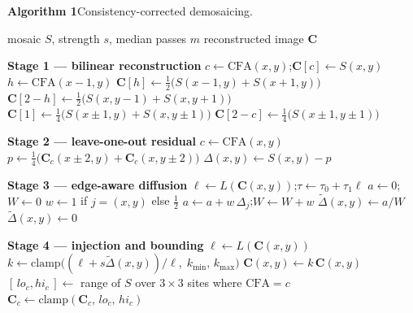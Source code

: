 \documentclass[10pt,a4paper]{article}
\begin{document}
%
\bigskip
\noindent\textbf{Algorithm 1}\quad Consistency-corrected demosaicing.\par
\medskip
\begin{algorithmic}[1]
\Require mosaic $S$, strength $s$, median passes $m$
\Ensure reconstructed image $\mathbf{C}$

\Statex
\Statex \textbf{Stage 1 --- bilinear reconstruction}
  \State $c \gets \mathrm{CFA}(x,y)$;\quad $\mathbf{C}[c] \gets S(x,y)$
   
    \State $h \gets \mathrm{CFA}(x{-}1,y)$
    \State $\mathbf{C}[h] \gets \tfrac{1}{2}\bigl(S(x{-}1,y) + S(x{+}1,y)\bigr)$
    \State $\mathbf{C}[2{-}h] \gets \tfrac{1}{2}\bigl(S(x,y{-}1) + S(x,y{+}1)\bigr)$
  \Else {}
    \State $\mathbf{C}[1] \gets \tfrac{1}{4}\bigl(S(x{\pm}1,y) + S(x,y{\pm}1)\bigr)$
    \State $\mathbf{C}[2{-}c] \gets \tfrac{1}{4}\bigl(S(x{\pm}1,y{\pm}1)\bigr)$
  \EndIf
\EndFor

\Statex
\Statex \textbf{Stage 2 --- leave-one-out residual}
  \State $c \gets \mathrm{CFA}(x,y)$
  \State $p \gets \tfrac{1}{4}\bigl(\mathbf{C}_c(x{\pm}2,y) + \mathbf{C}_c(x,y{\pm}2)\bigr)$
  \State $\Delta(x,y) \gets S(x,y) - p$
\EndFor

\Statex
\Statex \textbf{Stage 3 --- edge-aware diffusion}
  \State $\ell \gets L(\mathbf{C}(x,y))$;\quad $\tau \gets \tau_0 + \tau_1 \ell$
  \State $a \gets 0$;\quad $W \gets 0$
      \State $w \gets 1$ if $j = (x,y)$ else $\tfrac{1}{2}$
      \State $a \gets a + w\,\Delta_j$;\quad $W \gets W + w$
    \EndIf
  \EndFor
   \State $\tilde{\Delta}(x,y) \gets a / W$
  \Else \State $\tilde{\Delta}(x,y) \gets 0$ \EndIf
\EndFor

\Statex
\Statex \textbf{Stage 4 --- injection and bounding}
  \State $\ell \gets L(\mathbf{C}(x,y))$
  \If{$\ell > \epsilon$}
    \State $k \gets \mathrm{clamp}\bigl((\ell + s\tilde{\Delta}(x,y))/\ell,\;
           k_{\min},\, k_{\max}\bigr)$
    \State $\mathbf{C}(x,y) \gets k\,\mathbf{C}(x,y)$
  \EndIf
    \State $[\,lo_c, hi_c\,] \gets$ range of $S$ over $3\times3$ sites
           where $\mathrm{CFA} = c$
    \State $\mathbf{C}_c \gets \mathrm{clamp}(\mathbf{C}_c,\, lo_c,\, hi_c)$
  \EndFor
\EndFor


\end{algorithmic}
\end{document}
